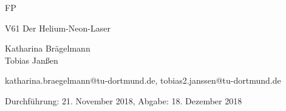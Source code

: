 \newcommand{\Titel}{V61 Der Helium-Neon-Laser}
\newcommand{\DatumDu}{21. November 2018}
\newcommand{\DatumAb}{18. Dezember 2018}
\newcommand{\Autoreins}{Katharina Brägelmann}
\newcommand{\Emaileins}{katharina.braegelmann@tu-dortmund.de}
\newcommand{\Autorzwei}{Tobias Janßen}
\newcommand{\Emailzwei}{tobias2.janssen@tu-dortmund.de}



\begin{titlepage}

\begin{center} \large

  FP
  \vspace*{2.5cm}

  {\huge \Titel}
  \vspace*{3cm}

  \Autoreins
  \\\Autorzwei
  \vspace*{1.5cm}

  \Emaileins, \Emailzwei


  Durchführung: \DatumDu, Abgabe: \DatumAb
  \vspace*{4.5cm}


\end{center}
\end{titlepage}
